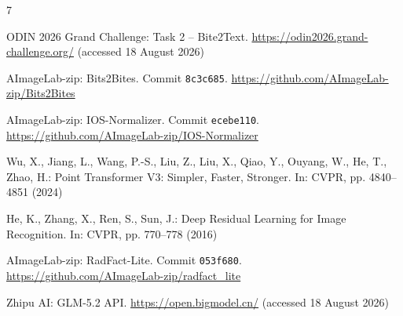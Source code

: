 \documentclass[runningheads]{llncs}
\begin{document}
\begin{thebibliography}{7}

ODIN 2026 Grand Challenge: Task 2 -- Bite2Text. \url{https://odin2026.grand-challenge.org/} (accessed 18 August 2026)

AImageLab-zip: Bits2Bites. Commit \texttt{8c3c685}. \url{https://github.com/AImageLab-zip/Bits2Bites}

AImageLab-zip: IOS-Normalizer. Commit \texttt{ecebe110}. \url{https://github.com/AImageLab-zip/IOS-Normalizer}

Wu, X., Jiang, L., Wang, P.-S., Liu, Z., Liu, X., Qiao, Y., Ouyang, W., He, T., Zhao, H.: Point Transformer V3: Simpler, Faster, Stronger. In: CVPR, pp. 4840--4851 (2024)

He, K., Zhang, X., Ren, S., Sun, J.: Deep Residual Learning for Image Recognition. In: CVPR, pp. 770--778 (2016)

AImageLab-zip: RadFact-Lite. Commit \texttt{053f680}. \url{https://github.com/AImageLab-zip/radfact_lite}

Zhipu AI: GLM-5.2 API. \url{https://open.bigmodel.cn/} (accessed 18 August 2026)

\end{thebibliography}
\end{document}
